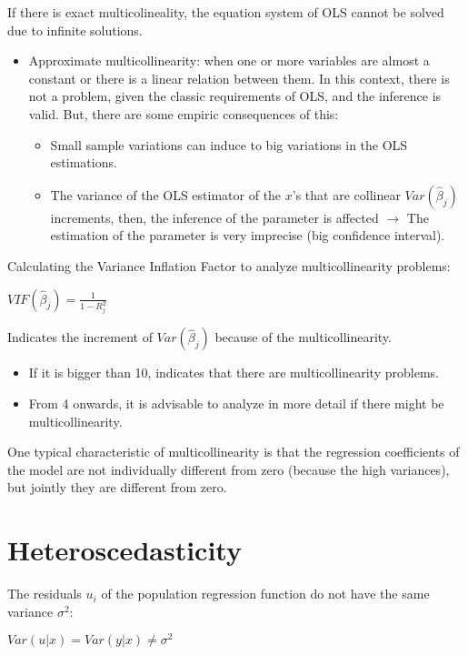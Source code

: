 \documentclass[10pt, a4paper, landscape]{extarticle}
\begin{document}
\begin{multicols}{3}
If there is exact multicolineality, the equation system of OLS cannot be solved due to infinite solutions.

\begin{itemize}[leftmargin=*]
\item Approximate multicollinearity: when one or more variables are almost a constant or there is a linear relation between them. In this context, there is not a problem, given the classic requirements of OLS, and the inference is valid. But, there are some empiric consequences of this:
\begin{itemize}[leftmargin=*]
\item Small sample variations can induce to big variations in the OLS estimations.
\item The variance of the OLS estimator of the $x$'s that are collinear $Var(\hat{\beta}_j)$ increments, then, the inference of the parameter is affected $\rightarrow$ The estimation of the parameter is very imprecise (big confidence interval).
\end{itemize}
\end{itemize}

Calculating the Variance Inflation Factor to analyze multicollinearity problems:

$VIF(\hat{\beta}_j) = \frac{1}{1-R_j^2}$

Indicates the increment of $Var(\hat{\beta}_j)$ because of the multicollinearity.

\begin{itemize}[leftmargin=*]
\item If it is bigger than 10, indicates that there are multicollinearity problems.
\item From 4 onwards, it is advisable to analyze in more detail if there might be
multicollinearity.
\end{itemize}

One typical characteristic of multicollinearity is that the regression coefficients of the model are not individually different from zero (because the high variances), but jointly they are different from zero.

\section*{Heteroscedasticity}

The residuals $u_i$ of the population regression function do not have the same variance $\sigma^2$:

$Var(u|x) = Var(y|x) \neq \sigma^2$


\end{multicols}
\end{document}
